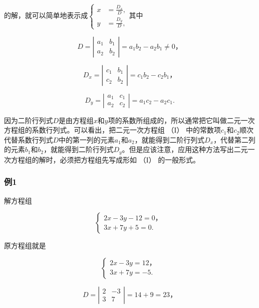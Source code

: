 的解，就可以简单地表示成\(\left\{\begin{aligned}x&=\frac{D_{x}}{D},\\ y&=\frac{D_{y}}{D},\end{aligned}\right.\)其中

\[
D = \left| \begin{array}{ll} a _ {1} & b _ {1} \\ a _ {2} & b _ {2} \end{array} \right| = a _ {1} b _ {2} - a _ {2} b _ {1} \neq 0\text{，}
\]

\[
D _ {x} = \left| \begin{array}{ll} c _ {1} & b _ {1} \\ c _ {2} & b _ {2} \end{array} \right| = c _ {1} b _ {2} - c _ {2} b _ {1}\text{，}
\]

\[
D _ {y} = \left| \begin{array}{ll} a _ {1} & c _ {1} \\ a _ {2} & c _ {2} \end{array} \right| = a _ {1} c _ {2} - a _ {2} c _ {1}.
\]

因为二阶行列式\(D\)是由方程组\(x\)和\(y\)项的系数所组成的，所以通常把它叫做二元一次方程组的系数行列式。可以看出，把二元一次方程组
（I）
中的常数项\(c_{1}\)和\(c_{2}\)顺次代替系数行列式\(D\)中的第一列的元素\(a_{1}\)和\(a_{2}\)，就能得到二阶行列式\(D_{x}\)，代替第二列的元素\(b_{1}\)和\(b_{2}\)，就能得到二阶行列式\(D_{y}\)。但是应该注意，应用这种方法写出二元一次方程组的解时，必须把方程组先写成形如
（I） 的一般形式。

\subsubsection{例1}

解方程组

\[
\left\{ \begin{array}{l} 2 x - 3 y - 12 = 0\text{，} \\ 3 x + 7 y + 5 = 0. \end{array} \right.
\]

 原方程组就是

\[
\left\{ \begin{array}{l} 2 x - 3 y = 12\text{，} \\ 3 x + 7 y = - 5. \end{array} \right.
\]

\[
D = \left| \begin{array}{cc} 2 & - 3 \\ 3 & 7 \end{array} \right| = 14 + 9 = 23\text{，}
\]


